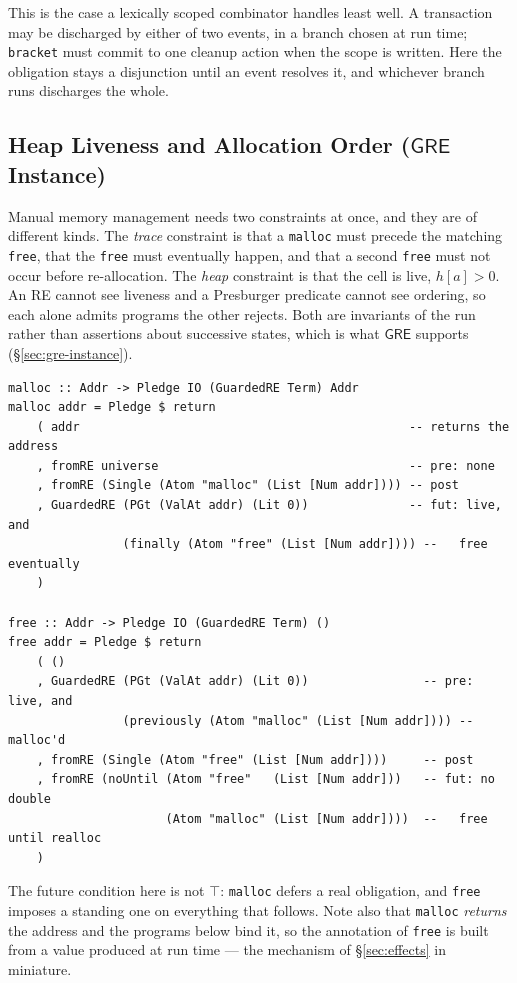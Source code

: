 \documentclass[acmsmall,screen]{acmart}
\newcommand{\GRE}{\mathsf{GRE}}
\begin{document}
This is the case a lexically scoped combinator handles least well.
A transaction may be discharged by either of two events, in a branch chosen
at run time; \lstinline{bracket} must commit to one cleanup action when the
scope is written.
Here the obligation stays a disjunction until an event resolves it, and
whichever branch runs discharges the whole.

\subsection{Heap Liveness and Allocation Order (\texorpdfstring{$\GRE$}{GRE} Instance)}
\label{sec:ex-gre-memory}

Manual memory management needs two constraints at once, and they are of
different kinds.
The \emph{trace} constraint is that a \lstinline{malloc} must precede the
matching \lstinline{free}, that the \lstinline{free} must eventually happen,
and that a second \lstinline{free} must not occur before re-allocation.
The \emph{heap} constraint is that the cell is live, $h[a] > 0$.
An RE cannot see liveness and a Presburger predicate cannot see ordering, so
each alone admits programs the other rejects.
Both are invariants of the run rather than assertions about successive
states, which is what $\GRE$ supports (\S\ref{sec:gre-instance}).

\begin{lstlisting}
malloc :: Addr -> Pledge IO (GuardedRE Term) Addr
malloc addr = Pledge $ return
    ( addr                                              -- returns the address
    , fromRE universe                                   -- pre: none
    , fromRE (Single (Atom "malloc" (List [Num addr]))) -- post
    , GuardedRE (PGt (ValAt addr) (Lit 0))              -- fut: live, and
                (finally (Atom "free" (List [Num addr]))) --   free eventually
    )

free :: Addr -> Pledge IO (GuardedRE Term) ()
free addr = Pledge $ return
    ( ()
    , GuardedRE (PGt (ValAt addr) (Lit 0))                -- pre: live, and
                (previously (Atom "malloc" (List [Num addr]))) -- malloc'd
    , fromRE (Single (Atom "free" (List [Num addr])))     -- post
    , fromRE (noUntil (Atom "free"   (List [Num addr]))   -- fut: no double
                      (Atom "malloc" (List [Num addr])))  --   free until realloc
    )
\end{lstlisting}

\noindent
The future condition here is not $\top$: \lstinline{malloc} defers a real
obligation, and \lstinline{free} imposes a standing one on everything that
follows.
Note also that \lstinline{malloc} \emph{returns} the address and the
programs below bind it, so the annotation of \lstinline{free} is built from
a value produced at run time --- the mechanism of \S\ref{sec:effects} in
miniature.
\end{document}
